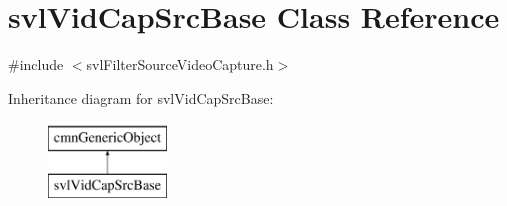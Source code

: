 \hypertarget{classsvl_vid_cap_src_base}{}\section{svl\+Vid\+Cap\+Src\+Base Class Reference}
\label{classsvl_vid_cap_src_base}


{\ttfamily \#include $<$svl\+Filter\+Source\+Video\+Capture.\+h$>$}

Inheritance diagram for svl\+Vid\+Cap\+Src\+Base\+:\begin{figure}[H]
\begin{center}
\leavevmode
\includegraphics[height=2.000000cm]{db/d61/classsvl_vid_cap_src_base}
\end{center}
\end{figure}
